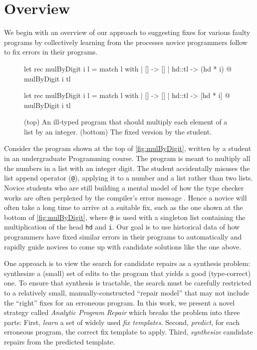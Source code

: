 \section{Overview}
\label{sec:overview}

We begin with an overview of our approach to suggesting fixes for various faulty
programs by collectively learning from the processes novice programmers follow
to fix errors in their programs.

\begin{figure}[ht]
\begin{ecode}
let rec mulByDigit i l =
  match l with
  | []     -> []
  | hd::tl -> (hd * i) @ mulByDigit i tl
\end{ecode}

\begin{ecode}
let rec mulByDigit i l =
  match l with
  | []     -> []
  | hd::tl -> [hd * i] @ mulByDigit i tl
\end{ecode}
\caption{(top) An ill-typed \ocaml program that should multiply each element
of a list by an integer. (bottom) The fixed version by the student.}
\label{fig:mulByDigit}
\end{figure}


 Consider the program \mbd shown at the top of
\autoref{fig:mulByDigit}, written by a student in an undergraduate Programming
course. The program is meant to multiply all the numbers in a list with an
integer digit. The student accidentally misuses the list append operator
(\texttt{@}), applying it to a number and a list rather than two lists.
%
Novice students who are still building a mental model of how the type checker
works are often perplexed by the compiler's error message \citep{Munson_2016}.
Hence a novice will often take a long time to arrive at a suitable fix, such as
the one shown at the bottom of \autoref{fig:mulByDigit}, where \texttt{@} is
used with a singleton list containing the multiplication of the head \texttt{hd}
and \texttt{i}.
%
Our goal is to use historical data of how programmers have fixed similar errors
in their programs to automatically and rapidly guide novices to come up with
candidate solutions like the one above.


%
One approach is to view the search for candidate repairs
as a synthesis problem: synthesize a (small) set of edits
to the program that yields a good (\eg type-correct) one.
%
To ensure that synthesis is tractable, the search must be
carefully restricted to a relatively small, manually-constructed
``repair model'' that may not include the ``right'' fixes for
an erroneous program.
%
In this work, we present a novel strategy called
\emph{Analytic Program Repair} which breaks the
problem into three parts:
%
First, \emph{learn} a set of widely used \emph{fix templates}.
%
Second, \emph{predict}, for each erroneous program, the correct fix template to apply.
%
Third, \emph{synthesize} candidate repairs from the predicted template.


